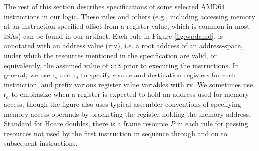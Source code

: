The rest of this section describes specifications of some selected \textsf{AMD64} instructions 
in our logic. 
These rules and others (e.g., including accessing memory at an instruction-specified offset from a register
value, which is common in most ISAs)
can be found in our artifact.
Each rule in Figure \ref{fig:wpdamd}, 
is annotated with an address value (\textsf{rtv}), 
i.e. a root address of an address-space, under which the resources mentioned in the specification are valid,
or equivalently, the assumed value of \lstinline|cr3| prior to executing the instructions.
In general, we use $\textsf{r}_s$ and $\textsf{r}_d$ to specify source and destination registers
for each instruction, and prefix various register value variables with \textsf{rv}.
We sometimes use $\textsf{r}_a$ to emphasize when a register is expected to hold an address used
for memory access, though the figure also uses typical assembler conventions of specifying
memory access operands by bracketing the register holding the memory address.
Standard for Hoare doubles, there is a frame resource $P$ in each rule for passing resources
not used by the first instruction in sequence through and on to subsequent instructions.

